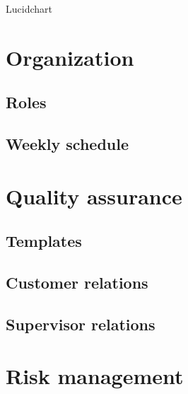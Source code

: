 Lucidchart


\section{Organization}
\subsection{Roles}
\subsection{Weekly schedule}

\section{Quality assurance}
\subsection{Templates}
\subsection{Customer relations}
\subsection{Supervisor relations}


\section{Risk management}